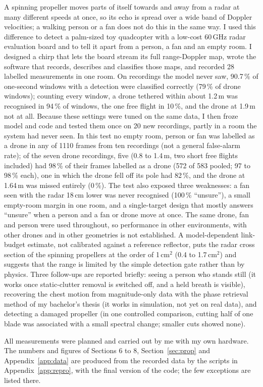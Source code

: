 \documentclass[11pt,a4paper]{article}
\begin{document}
\begin{titlepage}
\begin{minipage}{0.92\linewidth}
A spinning propeller moves parts of itself towards and away from a radar at many different speeds at once, so its echo is spread over a wide band of Doppler velocities; a walking person or a fan does not do this in the same way. I used this difference to detect a palm-sized toy quadcopter with a low-cost 60\,GHz radar evaluation board and to tell it apart from a person, a fan and an empty room. I designed a chirp that lets the board stream its full range-Doppler map, wrote the software that records, describes and classifies those maps, and recorded 28 labelled measurements in one room. On recordings the model never saw, 90.7\,\% of one-second windows with a detection were classified correctly (79\,\% of drone windows); counting every window, a drone tethered within about 1.2\,m was recognised in 94\,\% of windows, the one free flight in 10\,\%, and the drone at 1.9\,m not at all. Because these settings were tuned on the same data, I then froze model and code and tested them once on 20 new recordings, partly in a room the system had never seen. In this test no empty room, person or fan was labelled as a drone in any of 1110 frames from ten recordings (not a general false-alarm rate); of the seven drone recordings, five (0.8 to 1.4\,m, two short free flights included) had 98\,\% of their frames labelled as a drone (572 of 583 pooled; 97 to 98\,\% each), one in which the drone fell off its pole had 82\,\%, and the drone at 1.64\,m was missed entirely (0\,\%). The test also exposed three weaknesses: a fan seen with the radar 18\,cm lower was never recognised (100\,\% ``unsure''), a small empty-room margin in one room, and a single-target design that mostly answers ``unsure'' when a person and a fan or drone move at once. The same drone, fan and person were used throughout, so performance in other environments, with other drones and in other geometries is not established. A model-dependent link-budget estimate, not calibrated against a reference reflector, puts the radar cross section of the spinning propellers at the order of 1\,cm$^2$ (0.4 to 1.7\,cm$^2$) and suggests that the range is limited by the simple detection gate rather than by physics. Three follow-ups are reported briefly: seeing a person who stands still (it works once static-clutter removal is switched off, and a held breath is visible), recovering the chest motion from magnitude-only data with the phase retrieval method of my bachelor's thesis (it works in simulation, not yet on real data), and detecting a damaged propeller (in one controlled comparison, cutting half of one blade was associated with a small spectral change; smaller cuts showed none).
\end{minipage}
\vfill
{\small All measurements were planned and carried out by me with my own hardware. The numbers and figures of Sections 6 to 8, Section~\ref{sec:prop} and Appendix~\ref{app:data} are produced from the recorded data by the scripts in Appendix~\ref{app:repro}, with the final version of the code; the few exceptions are listed there.\par}
\end{titlepage}
\end{document}
